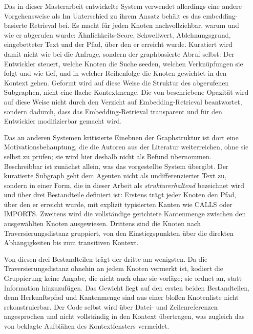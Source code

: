 Das in dieser Masterarbeit entwickelte System verwendet allerdings eine andere Vorgehensweise als \citeauthor{pusch2026hitlkgqa} Im Unterschied zu ihrem Ansatz behält es das embedding-basierte Retrieval bei. Es macht für jeden Knoten nachvollziehbar, warum und wie er abgerufen wurde: Ähnlichkeits-Score, Schwellwert, Ablehnungsgrund, eingebetteter Text und der Pfad, über den er erreicht wurde. Kuratiert wird damit nicht wie bei \citeauthor{pusch2026hitlkgqa} die Anfrage, sondern der graphbasierte Abruf selbst: Der Entwickler steuert, welche Knoten die Suche seeden, welchen Verknüpfungen sie folgt und wie tief, und in welcher Reihenfolge die Knoten gewichtet in den Kontext gehen. Geformt wird auf diese Weise die Struktur des abgerufenen Subgraphen, nicht eine flache Kontextmenge. Die von \citeauthor{pusch2026hitlkgqa} beschriebene Opazität wird auf diese Weise nicht durch den Verzicht auf Embedding-Retrieval beantwortet, sondern dadurch, dass das Embedding-Retrieval transparent und für den Entwickler modifizierbar gemacht wird.

Das an anderen Systemen kritisierte Einebnen der Graphstruktur \parencite{pusch2026hitlkgqa} ist dort eine Motivationsbehauptung, die die Autoren aus der Literatur weiterreichen, ohne sie selbst zu prüfen; sie wird hier deshalb nicht als Befund übernommen. Beschreibbar ist zunächst allein, was das vorgestellte System übergibt. Der kuratierte Subgraph geht dem Agenten nicht als undifferenzierter Text zu, sondern in einer Form, die in dieser Arbeit als \emph{strukturerhaltend} bezeichnet wird und über drei Bestandteile definiert ist: Erstens trägt jeder Knoten den Pfad, über den er erreicht wurde, mit explizit typisierten Kanten wie CALLS oder IMPORTS. Zweitens wird die vollständige gerichtete Kantenmenge zwischen den ausgewählten Knoten ausgewiesen. Drittens sind die Knoten nach Traversierungsdistanz gruppiert, von den Einstiegspunkten über die direkten Abhängigkeiten bis zum transitiven Kontext.

Von diesen drei Bestandteilen trägt der dritte am wenigsten. Da die Traversierungsdistanz ohnehin an jedem Knoten vermerkt ist, kodiert die Gruppierung keine Angabe, die nicht auch ohne sie vorläge; sie ordnet an, statt Information hinzuzufügen. Das Gewicht liegt auf den ersten beiden Bestandteilen, denn Herkunftspfad und Kantenmenge sind aus einer bloßen Knotenliste nicht rekonstruierbar. Der Code selbst wird über Datei- und Zeilenreferenzen angesprochen und nicht vollständig in den Kontext übertragen, was zugleich das von \citeauthor{pusch2026hitlkgqa} beklagte Aufblähen des Kontextfensters vermeidet.

